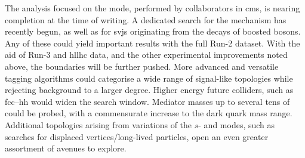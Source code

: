 The analysis focused on the \schannel mode, performed by collaborators in \acrshort{cms}, is nearing completion at the time of writing. A dedicated search for the \tchannel mechanism has recently begun, as well as for \glspl{svj} originating from the decays of boosted \PZprime bosons. Any of these could yield important results with the full Run-2 dataset. With the aid of Run-3 and \acrshort{hllhc} data, and the other experimental improvements noted above, the boundaries will be further pushed. More advanced and versatile tagging algorithms could categorise a wide range of signal-like topologies while rejecting background to a larger degree. Higher energy future colliders, such as \acrshort{fcc}--hh would widen the search window. Mediator masses up to several tens of \TeVns could be probed, with a commensurate increase to the dark quark mass range. Additional topologies arising from variations of the $s$- and \tchannel modes, such as searches for displaced vertices/long-lived particles, open an even greater assortment of avenues to explore.
